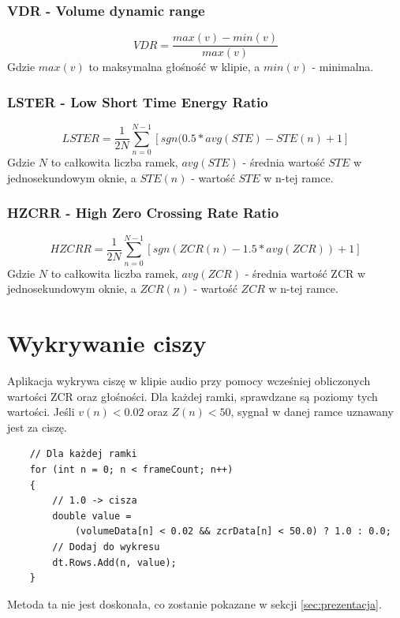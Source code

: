\documentclass[12pt,a4paper]{article}
\begin{document}
\subsubsection{VDR - Volume dynamic range\label{sec:vdr}}
\begin{equation}
VDR=\frac{max(v)-min(v)}{max(v)}
\end{equation}
Gdzie $max(v)$ to maksymalna głośność w klipie, a $min(v)$ - minimalna.

\subsubsection{LSTER - Low Short Time Energy Ratio\label{sec:lster}}
\begin{equation}
    LSTER=\frac{1}{2N}\sum_{n=0}^{N-1}[
        sgn(0.5*avg(STE)-STE(n)+1
    ]
\end{equation}
Gdzie $N$ to całkowita liczba ramek, $avg(STE)$ - średnia wartość $STE$ w jednosekundowym oknie, a $STE(n)$ - wartość $STE$ w n-tej ramce.

\subsubsection{HZCRR - High Zero Crossing Rate Ratio\label{sec:hzcrr}}
\begin{equation}
    HZCRR=\frac{1}{2N}\sum_{n=0}^{N-1}[
        sgn(ZCR(n)-1.5*avg(ZCR))+1
    ]
\end{equation}
Gdzie $N$ to całkowita liczba ramek, $avg(ZCR)$ - średnia wartość ZCR w jednosekundowym oknie, a $ZCR(n)$ - wartość $ZCR$ w n-tej ramce.

\section{Wykrywanie ciszy\label{sec:silent}}
Aplikacja wykrywa ciszę w klipie audio przy pomocy wcześniej obliczonych wartości ZCR oraz głośności. Dla każdej ramki, sprawdzane są poziomy tych wartości. Jeśli $v(n) < 0.02$ oraz $Z(n) < 50$, sygnał w danej ramce uznawany jest za ciszę.
\begin{verbatim}
    // Dla każdej ramki
    for (int n = 0; n < frameCount; n++)
    {
        // 1.0 -> cisza
        double value =
            (volumeData[n] < 0.02 && zcrData[n] < 50.0) ? 1.0 : 0.0;
        // Dodaj do wykresu
        dt.Rows.Add(n, value);
    }
\end{verbatim}
Metoda ta nie jest doskonała, co zostanie pokazane w sekcji \ref{sec:prezentacja}.
\end{document}
